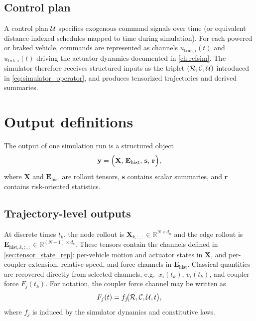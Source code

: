 \subsection{Control plan}

A control plan $\mathcal{U}$ specifies exogenous command signals over time (or equivalent distance-indexed schedules mapped to time during simulation).
For each powered or braked vehicle, commands are represented as channels $u_{\mathrm{trac},i}(t)$ and $u_{\mathrm{brk},i}(t)$ driving the actuator dynamics documented in \cref{ch:refsim}.
The simulator therefore receives structured inputs as the triplet $(\mathcal{R},\mathcal{C},\mathcal{U})$ introduced in \cref{eq:simulator_operator}, and produces tensorized trajectories and derived summaries.

\section{Output definitions}

The output of one simulation run is a structured object
\begin{equation}
    \mathbf{y} = \Bigl(\mathbf{X},\,\mathbf{E}_{\mathrm{hist}},\,\mathbf{s},\,\mathbf{r}\Bigr),
\end{equation}
where $\mathbf{X}$ and $\mathbf{E}_{\mathrm{hist}}$ are rollout tensors, $\mathbf{s}$ contains scalar summaries, and $\mathbf{r}$ contains risk-oriented statistics.

\subsection{Trajectory-level outputs}

At discrete times $t_k$, the node rollout is $\mathbf{X}_{k,:,:}\in\mathbb{R}^{N\times d_n}$ and the edge rollout is $\mathbf{E}_{\mathrm{hist},k,:,:}\in\mathbb{R}^{(N-1)\times d_e}$.
These tensors contain the channels defined in \cref{sec:tensor_state_rep}: per-vehicle motion and actuator states in $\mathbf{X}$, and per-coupler extension, relative speed, and force channels in $\mathbf{E}_{\mathrm{hist}}$.
Classical quantities are recovered directly from selected channels, e.g.\ $x_i(t_k)$, $v_i(t_k)$, and coupler force $F_j(t_k)$.
For notation, the coupler force channel may be written as
\begin{equation}
    F_j(t) = f_j\!\bigl(\mathcal{R},\mathcal{C},\mathcal{U},t\bigr),
    \label{eq:coupler_force}
\end{equation}
where $f_j$ is induced by the simulator dynamics and constitutive laws.


